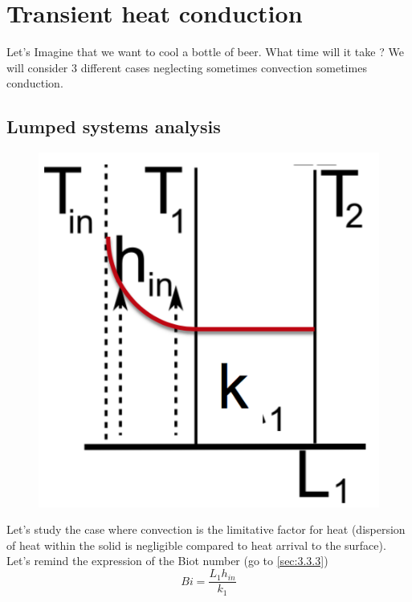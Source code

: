 
\chapter{Transient heat conduction}
	Let's Imagine that we want to cool a bottle of beer. What time will it take ? We will consider 3 different cases neglecting sometimes convection sometimes conduction. 
	
\section{Lumped systems analysis}
	\begin{figure}
	\vspace{-5mm}
	\includegraphics[scale=0.3]{ch3/8}
	\end{figure}	
	Let's study the case where convection is the limitative factor for heat (dispersion of heat within the solid is negligible compared to heat arrival to the surface). Let's remind the expression of the Biot number (go to \autoref{sec:3.3.3})
	\begin{equation}
		Bi = \frac{L_1h_{in}}{k_1}
	\end{equation}
	
